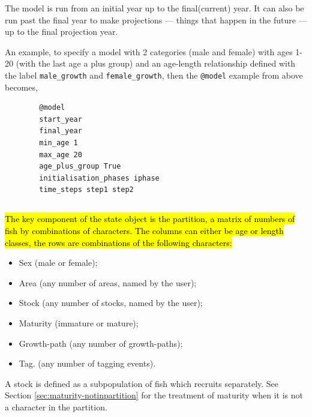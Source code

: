 The model is run from an initial year up to the final(current) year. It can also be run past the final year to make projections — things that happen in the future — up to the final projection year.

An example, to specify a model with 2 categories (male and female) with ages 1-20 (with the last age a plus group) and an age-length relationship defined with the label \texttt{male\_growth} and \texttt{female\_growth}, then the \texttt{@model} example from above becomes,
{\small{\begin{verbatim}
		@model
		start_year
		final_year
		min_age 1
		max_age 20
		age_plus_group True
		initialisation_phases iphase
		time_steps step1 step2
		\end{verbatim}}}

\subsection{}

\hl{The key component of the state object is the partition, a matrix of numbers of fish by combinations of characters. The columns can either be age or length classes, the rows are combinations of the following characters:}


\begin{itemize}
\item Sex (male or female);
\item Area (any number of areas, named by the user);
\item Stock (any number of stocks, named by the user);
\item Maturity (immature or mature);
\item Growth-path (any number of growth-paths);
\item Tag. (any number of tagging events).
\end{itemize}

A stock is defined as a subpopulation of fish which recruits separately. See Section \ref{sec:maturity-notinpartition} for the treatment of maturity when it is not a character in the partition. 


